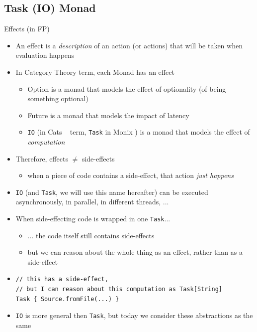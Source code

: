 \documentclass[presentation, 9pt]{beamer}\mode<presentation>{\usetheme{AMSBolognaFC}}
\begin{document}
\subsection{Task (IO) Monad}
\begin{frame}[fragile]{Effects (in FP)}
	\begin{itemize}
		\item An effect is a \emph{description} of an action (or actions) that will be taken when evaluation happens
		\item In Category Theory term, each Monad has an effect
		\begin{itemize}
			\item Option is a monad that models the effect of optionality (of being something optional)
   		\item Future is a monad that models the impact of latency
     	\item \texttt{IO} (in Cats ~\href{https://typelevel.org/cats/}{\faLink} term, \texttt{Task} in Monix \href{https://monix.io/}{\faLink}) is a monad that models the effect of \emph{computation}
		\end{itemize}
		\item Therefore, effects $\neq$ side-effects
		\begin{itemize}
			\item when a piece of code contains a side-effect, that action \emph{just happens}
		\end{itemize}
		\item \texttt{IO} (and \texttt{Task}, we will use this name hereafter) can be executed asynchronously, in parallel, in different threads, ...
  	\item {} When side-effecting code is wrapped in one \texttt{Task}...
		\begin{itemize}
			 \item ... the code itself still contains side-effects 
			 \item but we can reason about the whole thing as an effect, rather than as a side-effect
    \end{itemize}
		\item[] 	\begin{tcolorbox}[left=0pt, top=0pt, bottom=0pt]
			\begin{verbatim}
// this has a side-effect, 
// but I can reason about this computation as Task[String]
Task { Source.fromFile(...) } 
			\end{verbatim}
		\end{tcolorbox}
		\item {} \texttt{IO} is more general then \texttt{Task}, but today we consider these abstractions as the same
	\end{itemize}
\end{frame}
\end{document}
